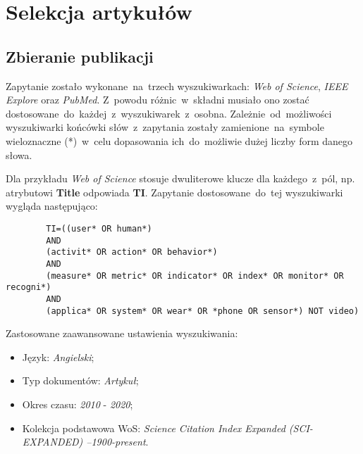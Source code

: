 \section{Selekcja artykułów}

\subsection{Zbieranie publikacji}
Zapytanie zostało wykonane~na~trzech wyszukiwarkach: \textit{Web of Science}, \textit{IEEE Explore} oraz \textit{PubMed}. Z~powodu różnic~w~składni musiało ono zostać dostosowane~do~każdej~z~wyszukiwarek~z~osobna. Zależnie~od~możliwości wyszukiwarki końcówki słów~z~zapytania zostały zamienione~na~symbole wieloznaczne (*)~w~celu dopasowania ich~do~możliwie dużej liczby form danego słowa.

Dla przykładu \textit{Web of Science} stosuje dwuliterowe klucze dla każdego~z~pól, np. atrybutowi {\bf Title} odpowiada {\bf TI}. Zapytanie dostosowane~do~tej wyszukiwarki wygląda następująco:

\bigskip
\begin{center}
	\begin{minipage}{0.85\linewidth}
		\begin{verbatim}
		TI=((user* OR human*) 
		AND 
		(activit* OR action* OR behavior*)
		AND 
		(measure* OR metric* OR indicator* OR index* OR monitor* OR recogni*) 
		AND 
		(applica* OR system* OR wear* OR *phone OR sensor*) NOT video)
		\end{verbatim}
	\end{minipage}
\end{center}
\bigskip

\noindent Zastosowane zaawansowane ustawienia wyszukiwania:
\begin{itemize}
    \item Język: {\it Angielski};
    \item Typ dokumentów: {\it Artykuł};
    \item Okres czasu: {\it 2010} - {\it 2020};
    \item Kolekcja podstawowa WoS: {\it Science Citation Index Expanded (SCI-EXPANDED) --1900-present}.
\end{itemize}

